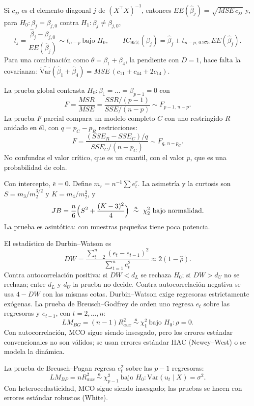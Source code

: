 \documentclass[11pt,letterpaper]{article}
\begin{document}
 Si $c_{jj}$ es el elemento diagonal $j$ de $(X^\top X)^{-1}$, entonces $EE(\hat\beta_j)=\sqrt{MSE\,c_{jj}}$ y, para $H_0:\beta_j=\beta_{j,0}$ contra $H_1:\beta_j\neq\beta_{j,0}$,
\[
t_j=\frac{\hat\beta_j-\beta_{j,0}}{EE(\hat\beta_j)}\sim t_{n-p}\ \text{bajo }H_0,\qquad IC_{95\%}(\beta_j)=\hat\beta_j\pm t_{n-p;\,0.975}\,EE(\hat\beta_j).
\]
Para una combinación como $\theta=\beta_1+\beta_4$, la pendiente con $D=1$, hace falta la covarianza: $\widehat{\mathrm{Var}}(\hat\beta_1+\hat\beta_4)=MSE\,(c_{11}+c_{44}+2c_{14})$.

 La prueba global contrasta $H_0:\beta_1=\dots=\beta_{p-1}=0$ con
\[
F=\frac{MSR}{MSE}=\frac{SSR/(p-1)}{SSE/(n-p)}\sim F_{p-1,\,n-p}.
\]
La prueba $F$ parcial compara un modelo completo $C$ con uno restringido $R$ anidado en él, con $q=p_C-p_R$ restricciones:
\[
F=\frac{(SSE_R-SSE_C)/q}{SSE_C/(n-p_C)}\sim F_{q,\,n-p_C}.
\]
No confundas el valor crítico, que es un cuantil, con el valor $p$, que es una probabilidad de cola.

 Con intercepto, $\bar e=0$. Define $m_r=n^{-1}\sum e_t^r$. La asimetría y la curtosis son $S=m_3/m_2^{3/2}$ y $K=m_4/m_2^2$, y
\[
JB=\frac n6\Bigl(S^2+\frac{(K-3)^2}{4}\Bigr)\ \stackrel{a}{\sim}\ \chi^2_2\ \text{bajo normalidad}.
\]
La prueba es asintótica: con muestras pequeñas tiene poca potencia.

 El estadístico de Durbin--Watson es
\[
DW=\frac{\sum_{t=2}^n(e_t-e_{t-1})^2}{\sum_{t=1}^ne_t^2}\approx2(1-\hat\rho).
\]
Contra autocorrelación positiva: si $DW<d_L$ se rechaza $H_0$; si $DW>d_U$ no se rechaza; entre $d_L$ y $d_U$ la prueba no decide. Contra autocorrelación negativa se usa $4-DW$ con las mismas cotas. Durbin--Watson exige regresoras estrictamente exógenas. La prueba de Breusch--Godfrey de orden uno regresa $e_t$ sobre las regresoras y $e_{t-1}$, con $t=2,\dots,n$:
\[
LM_{BG}=(n-1)R^2_{aux}\ \stackrel{a}{\sim}\ \chi^2_1\ \text{bajo }H_0:\rho=0.
\]
Con autocorrelación, MCO sigue siendo insesgado, pero los errores estándar convencionales no son válidos; se usan errores estándar HAC (Newey--West) o se modela la dinámica.

 La prueba de Breusch--Pagan regresa $e_t^2$ sobre las $p-1$ regresoras:
\[
LM_{BP}=nR^2_{aux}\ \stackrel{a}{\sim}\ \chi^2_{p-1}\ \text{bajo }H_0:\mathrm{Var}(u_t\mid X)=\sigma^2.
\]
Con heterocedasticidad, MCO sigue siendo insesgado; las pruebas se hacen con errores estándar robustos (White).
\end{document}
